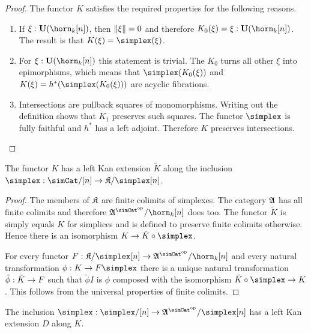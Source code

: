 \begin{proof}
The functor $K$ satisfies the required properties for the following reasons.
\begin{enumerate}
\item If $\xi\of\base(\horn_k[n])$, then $\Vert \xi \Vert=0$ and therefore $K_0(\xi) = \xi\of \base(\horn_k[n])$. The result is that $K(\xi)=\simplex(\xi)$.
\item For $\xi\of\base(\horn_k[n])$ this statement is trivial. The $K_0$ turns all other $\xi$ into epimorphisms, which means that $\simplex(K_0(\xi))$ and $K(\xi) = h\ri(\simplex(K_0(\xi)))$ are acyclic fibrations. %
\item Intersections are pullback squares of monomorphisms. Writing out the definition shows that $K_1$ preserves such squares. The functor $\simplex$ is fully faithful and $h^*$ has a left adjoint. Therefore $K$ preserves intersections. 
\end{enumerate}
\end{proof}

\begin{lemma} The functor $K$ has a left Kan extension $\tilde K$ along the inclusion $\simplex\of \simCat/[n]\to\compact/\simplex[n]$. \label{left extension 1} \end{lemma}

\begin{proof} The members of $\mathfrak{K}$ are finite colimits of simplexes. The category $\mathfrak A$ has all finite colimits and therefore $\ambient\s/\horn_k[n]$ does too. The functor $\tilde K$ is simply equals $K$ for simplices and is defined to preserve finite colimits otherwise. Hence there is an isomorphism $K\to \tilde K\circ \simplex$. 

For every functor $F\of\compact/\simplex[n]\to\ambient\s/\horn_k[n]$ and every natural transformation $\phi\of K\to F\simplex$ there is a unique natural transformation $\tilde\phi: \tilde K\to F$ such that $\tilde\phi I$ is $\phi$ composed with the isomorphism $\tilde K\circ \simplex\to K$. This follows from the universal properties of finite colimits.
\end{proof}%


\begin{lemma} The inclusion $\simplex\of\simplex/[n]\to\ambient\s/\simplex[n]$ has a left Kan extension $D$ along $K$. \label{left extension 2} \end{lemma} 

